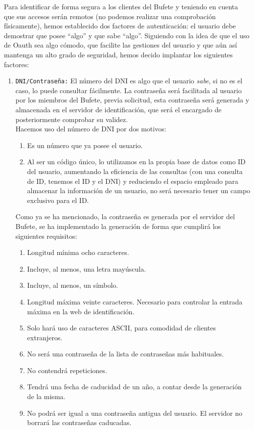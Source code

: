 \documentclass[a4,12pt,onecolum]{article}
\begin{document}
Para identificar de forma segura a los clientes del Bufete y teniendo en cuenta que sus accesos serán remotos (no podemos realizar una comprobación físicamente), hemos establecido dos factores de autenticación: el usuario debe demostrar que posee ``algo'' y que sabe ``algo''. Siguiendo con la idea de que el uso de Oauth sea algo cómodo, que facilite las gestiones del usuario y que aún así mantenga un alto grado de seguridad, hemos decido implantar los siguientes factores:

\begin{enumerate}
	\item \texttt{DNI/Contraseña:} El número del DNI es algo que el usuario \emph{sabe}, si no es el caso, lo 		puede consultar fácilmente. La contraseña será facilitada al usuario por los miembros del Bufete, previa 		solicitud, esta contraseña será generada y almacenada en el servidor de identificación, que será el 			encargado de posteriormente comprobar su validez. \\

	Hacemos uso del número de DNI por dos motivos:
	\begin{enumerate}
		\item Es un número que ya posee el usuario.
		\item Al ser un código único, lo utilizamos en la propia base de datos como ID del usuario, aumentando 			la eficiencia de las consultas (con una consulta de ID, tenemos el ID y el DNI) y reduciendo el espacio 		empleado para almacenar la información de un usuario, no será necesario tener un campo exclusivo para 			el ID. \\
	\end{enumerate}

	Como ya se ha mencionado, la contraseña es generada por el servidor del Bufete, se ha implementado la 			generación de forma que cumplirá los siguientes requisitos:
	\begin{enumerate}
		\item Longitud mínima ocho caracteres.
		\item Incluye, al menos, una letra mayúscula.
		\item Incluye, al menos, un símbolo.
		\item Longitud máxima veinte caracteres. Necesario para controlar la entrada máxima en la web de 				identificación.
		\item Solo hará uso de caracteres ASCII, para comodidad de clientes extranjeros.
		\item No será una contraseña de la lista de contraseñas más habituales.
		\item No contendrá repeticiones.
		\item Tendrá una fecha de caducidad de un año, a contar desde la generación de la misma.
		\item No podrá ser igual a una contraseña antigua del usuario. El servidor no borrará las contraseñas 			caducadas.
	\end{enumerate}


\end{enumerate}
\end{document}
